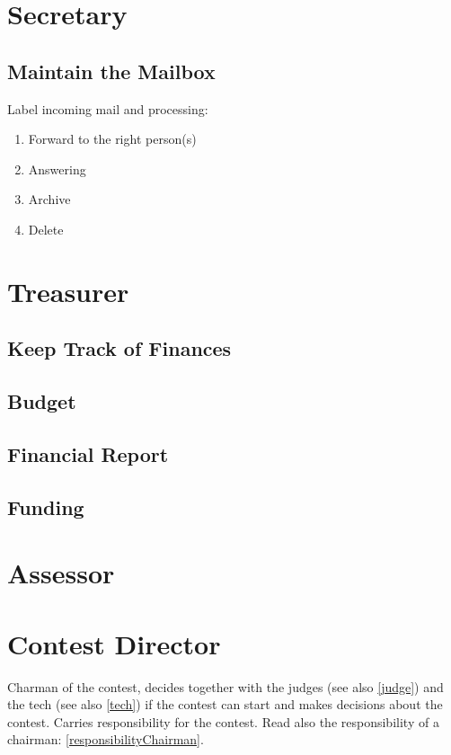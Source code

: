\section{Secretary}
	\subsection{Maintain the Mailbox}
	Label incoming mail and processing:
	\begin{enumerate}
	\item Forward to the right person(s)
	\item Answering
	\item Archive 
	\item Delete	
	\end{enumerate}	
	
\section{Treasurer}
	\subsection{Keep Track of Finances}
	
	\subsection{Budget}
	
	\subsection{Financial Report}
	
	\subsection{Funding}
	
\section{Assessor}
	
\section{Contest Director}
Charman of the contest, decides together with the judges (see also \ref{judge}) and the tech (see also \ref{tech}) if the contest can start and makes decisions about the contest. Carries responsibility for the contest. \label{responsibilityContestDirector} Read also the responsibility of a chairman: \ref{responsibilityChairman}.

